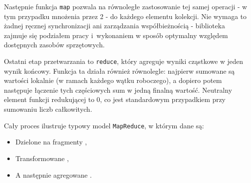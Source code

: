 Następnie funkcja \texttt{map} pozwala na równoległe zastosowanie tej samej operacji - w tym przypadku mnożenia przez 2 - do każdego elementu kolekcji. Nie wymaga to żadnej ręcznej synchronizacji ani zarządzania współbieżnością - biblioteka zajmuje się podziałem pracy i~wykonaniem w sposób optymalny względem dostępnych zasobów sprzętowych.

Ostatni etap przetwarzania to \texttt{reduce}, który agreguje wyniki cząstkowe w jeden wynik końcowy. Funkcja ta działa również równolegle: najpierw sumowane są wartości lokalnie (w ramach każdego wątku roboczego), a dopiero potem następuje łączenie tych częściowych sum w jedną finalną wartość. Neutralny element funkcji redukującej to 0, co jest standardowym przypadkiem przy sumowaniu liczb całkowitych.

Cały proces ilustruje typowy model \texttt{MapReduce}, w którym dane są:
\begin{itemize}
\item Dzielone na fragmenty ,
\item Transformowane ,
\item A następnie agregowane .
\end{itemize}
